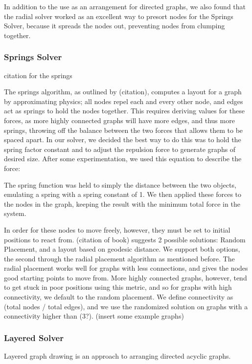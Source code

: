 \documentclass{article}
\begin{document}

In addition to the use as an arrangement for directed graphs, we also found that the radial solver worked as an excellent way to presort nodes for the Springs Solver, because it spreads the nodes out, preventing nodes from clumping together.


\subsubsection{Springs Solver}
citation for the springs\cite{springs}


The springs algorithm, as outlined by (citation), computes a layout for a graph by approximating physics; all nodes repel each and every other node, 
and edges act as springs to hold the nodes together. This requires deriving values for these forces, as more highly connected graphs will have 
more edges, and thus more springs, throwing off the balance between the two forces that allows them to be spaced apart. In our solver, we decided
the best way to do this was to hold the spring factor constant and to adjust the repulsion force to generate graphs of desired size. After some 
experimentation, we used this equation to describe the force: 


The spring function was held to simply the distance between the two objects, emulating a spring with a spring constant of 1. We then applied these forces
to the nodes in the graph, keeping the result with the minimum total force in the system.

In order for these nodes to move freely, however, they must be set to initial positions to react from. (citation of book) suggests 2 possible solutions: 
Random Placement, and a layout based on geodesic distance. We support both options, the second through the radial placement algorithm as mentioned before.
The radial placement works well for graphs with less connections, and gives the nodes good starting points to move from. More highly connected graphs,
however, tend to get stuck in poor positions using this metric, and so for graphs with high connectivity, we default to the random placement. We define 
connectivity as (total nodes / total edges), and we use the randomized solution on graphs with a connectivity higher than (3?).
(insert some example graphs)

\subsubsection{Layered Solver}
Layered graph drawing is an approach to arranging directed acyclic graphs.
\end{document}
